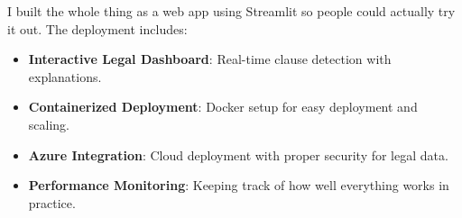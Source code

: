 I built the whole thing as a web app using Streamlit so people could actually try it out. The deployment includes:

\begin{itemize}
    \item \textbf{Interactive Legal Dashboard}: Real-time clause detection with explanations.
    \item \textbf{Containerized Deployment}: Docker setup for easy deployment and scaling.
    \item \textbf{Azure Integration}: Cloud deployment with proper security for legal data.
    \item \textbf{Performance Monitoring}: Keeping track of how well everything works in practice.
\end{itemize}